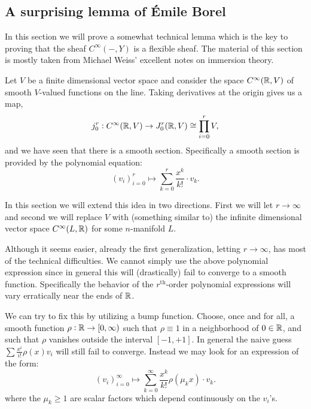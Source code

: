 \documentclass{article}
\newtheorem{proposed work}[theorem]{Proposed Work}
\theoremstyle{definition}
\begin{document}
\subsection{A surprising lemma of \'Emile Borel}

In this section we will prove a somewhat technical lemma which is the key to proving that the sheaf $C^\infty(-,Y)$ is a flexible sheaf. The material of this section is mostly taken from Michael Weiss' excellent notes on immersion theory. 



Let $V$ be a finite dimensional vector space and consider the space $C^\infty(\mathbb R, V)$ of smooth $V$-valued functions on the line. Taking derivatives at the origin gives us a map,
\begin{equation*}
	j^r_0: C^\infty(\mathbb R, V) \to J^r_0(\mathbb R, V) \cong \prod_{i=0}^r V,
\end{equation*}
and we have seen that there is a smooth section. Specifically a smooth section is provided by the polynomial equation:
\begin{equation*}
	(v_i)_{i=0}^{r} \mapsto \sum_{k=0}^r \frac{x^k}{k!} \cdot v_k.
\end{equation*}

In this section we will extend this idea in two directions. First we will let $r \to \infty$ and second we will replace $V$ with  (something similar to) the infinite dimensional vector space $C^\infty(L, \mathbb R)$ for some $n$-manifold $L$. 

Although it seems easier, already the first generalization, letting $r \to \infty$, has most of the technical difficulties. We cannot simply use the above polynomial expression since in general this will (drastically) fail to converge to a smooth function. Specifically the behavior of the $r^\textrm{th}$-order polynomial expressions will vary erratically near the ends of $\mathbb R$. 

We can try to fix this by utilizing a bump function. 
Choose, once and for all, a smooth function $\rho: \mathbb R \to [0, \infty)$ such that $\rho \equiv 1$ in a neighborhood of $0 \in \mathbb R$, and such that $\rho$ vanishes outside the interval $[-1,+1]$. In general the naive guess $\sum \frac{x^i}{i!} \rho(x) v_i$ will still fail to converge. Instead we may look for an expression of the form:
\begin{equation*}
	(v_i)_{i=0}^\infty \mapsto \sum_{k=0}^\infty \frac{x^k}{k!} \rho(\mu_k x) \cdot v_k.
\end{equation*}
where the $\mu_k \geq 1$ are scalar factors which depend continuously on the $v_i$'s. 
\end{document}
